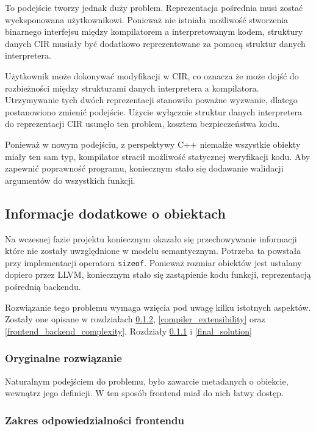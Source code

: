 To podejście tworzy jednak duży problem. Reprezentacja pośrednia musi zostać wyeksponowana użytkownikowi. Ponieważ nie istniała możliwość stworzenia binarnego interfejsu między kompilatorem a interpretowanym kodem, struktury danych CIR musiały być dodatkowo reprezentowane za pomocą struktur danych interpretera.


Użytkownik może dokonywać modyfikacji w CIR, co oznacza że może dojść do rozbieżności między strukturami danych interpretera a kompilatora. Utrzymywanie tych dwóch reprezentacji stanowiło poważne wyzwanie, dlatego postanowiono zmienić podejście. Użycie wyłącznie struktur danych interpretera do reprezentacji CIR usunęło ten problem, kosztem bezpieczeństwa kodu.


Ponieważ w nowym podejściu, z perspektywy C++ niemalże wszystkie obiekty miały ten sam typ, kompilator stracił możliwość statycznej weryfikacji kodu.
Aby zapewnić poprawność programu, koniecznym stało się dodawanie walidacji argumentów do wszystkich funkcji.

\subsection{Informacje dodatkowe o obiektach}
Na wczesnej fazie projektu koniecznym okazało się przechowywanie informacji które nie zostały uwzględnione w modelu semantycznym.
Potrzeba ta powstała przy implementacji operatora \texttt{sizeof}.
Ponieważ rozmiar obiektów jest ustalany dopiero przez LLVM, koniecznym stało się zastąpienie kodu funkcji, reprezentacją pośrednią backendu.

Rozwiązanie tego problemu wymaga wzięcia pod uwagę kilku istotnych aspektów.
Zostały one opisane w rozdziałach \ref{frontend_responsibility}, \ref{compiler_extensibility} oraz \ref{frontend_backend_complexity}.
Rozdziały \ref{original_solution} i \ref{final_solution}

\subsubsection{Oryginalne rozwiązanie}\label{original_solution}

Naturalnym podejściem do problemu, było zawarcie metadanych o obiekcie, wewnątrz jego definicji.
W ten sposób frontend miał do nich łatwy dostęp.

\subsubsection{Zakres odpowiedzialności frontendu} \label{frontend_responsibility}

